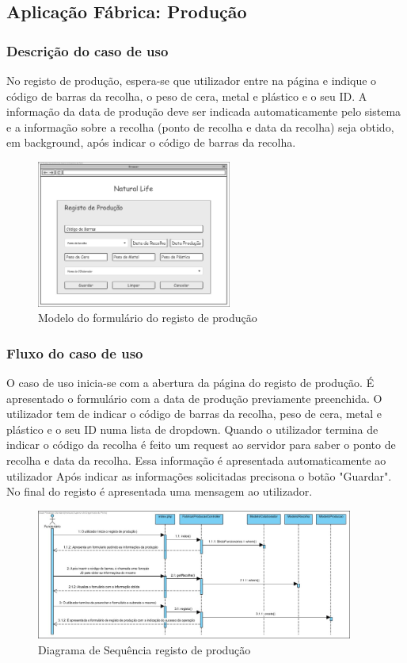 \subsection{Aplicação Fábrica: Produção}
\subsubsection*{Descrição do caso de uso}
No registo de produção, espera-se que utilizador entre na página e indique o código de barras da recolha, o peso de cera, metal e plástico e o seu ID. A informação da data de produção deve ser indicada automaticamente pelo sistema e a informação sobre a recolha (ponto de recolha e data da recolha) seja obtido, em background, após indicar o código de barras da recolha.

\begin{figure}[H] 
	\begin{center}
		\includegraphics[width=0.57\textwidth,keepaspectratio]{figuras/Diagramas_vp/DI_Fabrica_3_Registo_de_Producao.jpg}
		\caption{Modelo do formulário do registo de produção}
		\label{fig:di_producao} 
	\end{center}
\end{figure}


\subsubsection*{Fluxo do caso de uso}
O caso de uso inicia-se com a abertura da página do registo de produção. É apresentado o formulário com a data de produção previamente preenchida. O utilizador tem de indicar o código de barras da recolha, peso de cera, metal e plástico e o seu ID numa lista de dropdown. Quando o utilizador termina de indicar o código da recolha é feito um request ao servidor para saber o ponto de recolha e data da recolha. Essa informação é apresentada automaticamente ao utilizador Após indicar as informações solicitadas precisona o botão "Guardar". No final do registo é apresentada uma mensagem ao utilizador.

\begin{figure}[h!] 
	\begin{center}
		\includegraphics[width=0.93\textwidth,keepaspectratio]{figuras/Diagramas_vp/SD_Fabrica_3_Registo_de_Producao.jpg}
		\caption{Diagrama de Sequência registo de produção}
		\label{fig:sd_producao} 
	\end{center}
\end{figure}
